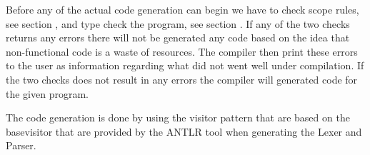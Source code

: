 Before any of the actual code generation can begin we have to check scope rules, see section , and type check the program, see section . If any of the two checks returns any errors there will not be generated any code based on the idea that non-functional code is a waste of resources. The compiler then print these errors to the user as information regarding what did not went well under compilation. If the two checks does not result in any errors the compiler will generated code for the given program.

The code generation is done by using the visitor pattern that are based on the basevisitor that are provided by the ANTLR tool when generating the Lexer and Parser.